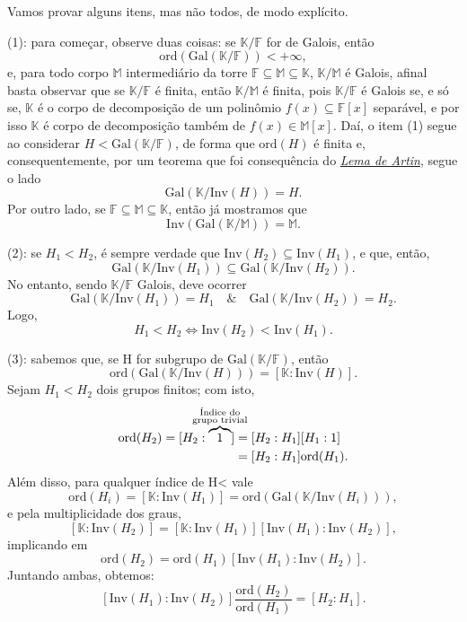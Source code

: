 \documentclass[../algebraIII_notes.tex]{subfiles}
\begin{document}
\begin{proof*}
	Vamos provar alguns itens, mas não todos, de modo explícito.

	(1):  para começar, observe duas coisas: se \(\mathbb{K}/\mathbb{F}\) for de Galois, então
	\[
		\mathrm{ord}(\mathrm{Gal}(\mathbb{K}/\mathbb{F}))< +\infty,
	\]
	e, para todo corpo \(\mathbb{M}\) intermediário da torre \(\mathbb{F}\subseteq \mathbb{M}\subseteq \mathbb{K}\), \(\mathbb{K}/\mathbb{M}\) é Galois, afinal basta observar que se \(\mathbb{K}/\mathbb{F}\) é finita, então \(\mathbb{K}/\mathbb{M}\) é finita, pois \(\mathbb{K}/\mathbb{F}\) é Galois se, e só se, \(\mathbb{K}\) é o corpo de decomposição de um polinômio \(f(x)\subseteq \mathbb{F}[x]\) separável, e por isso \(\mathbb{K}\) é corpo de decomposição também de \(f(x)\in \mathbb{M}[x]\).
	Daí, o item (1) segue ao considerar \(H < \mathrm{Gal}(\mathbb{K}/\mathbb{F})\), de forma que \(\mathrm{ord}(H)\) é finita e, consequentemente, por um teorema que foi consequência do \hyperlink{artin_lemma}{\textit{Lema de Artin}}, segue o lado
	\[
		\mathrm{Gal}(\mathbb{K}/\mathrm{Inv}(H)) = H.
	\]
	Por outro lado, se \(\mathbb{F}\subseteq \mathbb{M}\subseteq \mathbb{K}\), então já mostramos que
	\[
		\mathrm{Inv}(\mathrm{Gal}(\mathbb{K}/\mathbb{M})) = \mathbb{M}.
	\]

	(2): se \(H_1 < H_2\), é sempre verdade que \(\mathrm{Inv}(H_2)\subseteq \mathrm{Inv}(H_1)\), e que, então,
	\[
		\mathrm{Gal}(\mathbb{K}/\mathrm{Inv}(H_1)) \subseteq \mathrm{Gal}(\mathbb{K}/\mathrm{Inv}(H_2)).
	\]
	No entanto, sendo \(\mathbb{K}/\mathbb{F}\) Galois, deve ocorrer
	\[
		\mathrm{Gal}(\mathbb{K}/\mathrm{Inv}(H_1)) = H_1 \quad\&\quad \mathrm{Gal}(\mathbb{K}/\mathrm{Inv}(H_2))=H_2.
	\]
	Logo,
	\[
		H_1 < H_2 \Longleftrightarrow \mathrm{Inv}(H_2) < \mathrm{Inv}(H_1).
	\]

	(3): sabemos que, se H for subgrupo de \(\mathrm{Gal}(\mathbb{K}/\mathbb{F})\), então
	\[
		\mathrm{ord}(\mathrm{Gal}(\mathbb{K}/\mathrm{Inv}(H))) = [\mathbb{K}:\mathrm{Inv}(H)].
	\]
	Sejam \(H_1 < H_2\) dois grupos finitos; com isto,
	\begin{align*}
		\mathrm{ord}(H_2) = [H_2:\overbrace{1}^{\mathclap{\substack{\text{Índice do} \\\text{grupo trivial} }}}] &= [H_2:H_1][H_1:1]\\
		 & = [H_2:H_1]\mathrm{ord}(H_1).
	\end{align*}
	Além disso, para qualquer índice de H< vale
	\[
		\mathrm{ord}(H_{i}) = [\mathbb{K}:\mathrm{Inv}(H_1)]= \mathrm{ord}(\mathrm{Gal}(\mathbb{K}/\mathrm{Inv}(H_i))),
	\]
	e pela multiplicidade dos graus,
	\[
		[\mathbb{K}:\mathrm{Inv}(H_2)] = [\mathbb{K}:\mathrm{Inv}(H_1)][\mathrm{Inv}(H_1):\mathrm{Inv}(H_2)],
	\]
	implicando em
	\[
		\mathrm{ord}(H_2)=\mathrm{ord}(H_1)[\mathrm{Inv}(H_1):\mathrm{Inv}(H_2)].
	\]
	Juntando ambas, obtemos:
	\[
		[\mathrm{Inv}(H_1):\mathrm{Inv}(H_2)]\frac{\mathrm{ord}(H_2)}{\mathrm{ord}(H_1)} = [H_2:H_1].
	\]


\end{proof*}
\end{document}

